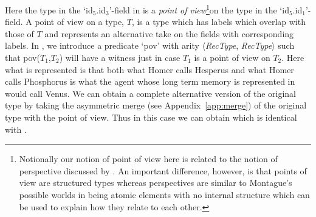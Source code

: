 Here the type in the `id$_5$.id$_3$'-field in \preveg{} is a
\textit{point of view}\footnote{Notionally our notion of point of view
  here is related to the notion of perspective discussed by
  \cite{AsudehGiorgolo2016}.  An important difference, however, is
  that points of view are structured types whereas perspectives are
  similar to Montague's possible worlds in being atomic elements with
  no internal structure which can be used to explain how they relate to each other.}on the type in the `id$_5$.id$_1$'-field.  A
point of view on a type, $T$, is a type which has labels which overlap
with those of $T$ and represents an alternative take on the fields
with corresponding labels.  In \preveg{}, we introduce a predicate `pov' with arity
$\langle$\textit{RecType}, \textit{RecType}$\rangle$ such that
pov($T_1$,$T_2$) will have a witness just in case $T_1$ is a point of
view on $T_2$.  Here what is represented is that both what Homer calls
Hesperus and what Homer calls Phosphorus is what the agent whose long
term memory is represented in \preveg{} would call Venus.  We can
obtain a complete alternative version of the original type by taking
the asymmetric merge (see Appendix~\ref{app:merge}) of the original
type with the point of view.  Thus in this case we can obtain
 which is identical with .
